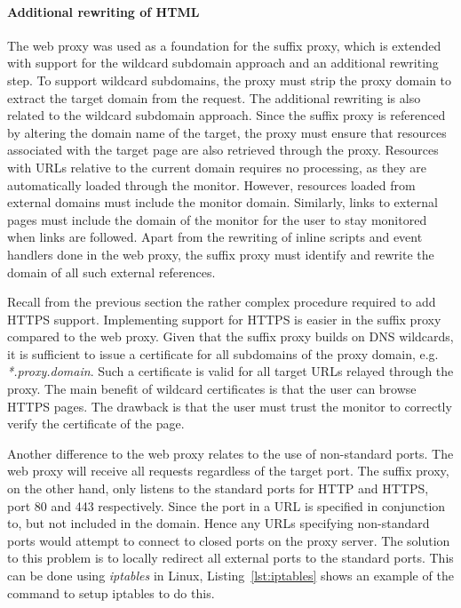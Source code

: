 \documentclass{llncs}
\begin{document}
\paragraph{Additional rewriting of HTML}


The web proxy was used as a foundation for the suffix proxy, which is extended
with support for the wildcard subdomain approach and an additional rewriting step. 
To support wildcard subdomains, the proxy must strip the proxy domain to extract 
the target domain from the request. 
The additional rewriting is also related to the wildcard subdomain approach.
Since the suffix proxy is referenced by altering the domain name of the target, 
the proxy must ensure that resources associated with the target page are also 
retrieved through the proxy. Resources with URLs relative to the current domain 
requires no processing, as they are automatically loaded through the monitor. 
However, resources loaded from external domains must 
include the monitor domain. Similarly, links to external pages must include the domain of the monitor 
for the user to stay %
monitored %
when links are followed.
Apart from the rewriting of inline 
scripts and event handlers done in the web proxy, the suffix proxy must 
identify and rewrite the domain of all such external references. 


Recall from the previous section the rather complex procedure required to add HTTPS support.
Implementing support for HTTPS is easier in the suffix proxy compared to the web proxy. 
Given that the suffix proxy builds on DNS wildcards, it is sufficient to issue a certificate
for all subdomains of the proxy domain, e.g. \emph{*.proxy.domain}. Such a 
certificate is valid for all target URLs relayed through the proxy.
The main benefit of wildcard certificates is that the user can browse HTTPS pages. 
The drawback is that the user must trust the monitor to correctly verify the 
certificate of the page.

Another difference to the web proxy relates to the use of non-standard ports.
The web proxy will receive all requests regardless of the target port. The 
suffix proxy, on the other hand, only listens to the standard ports for HTTP and HTTPS, port 80 and 
443 respectively. Since the port in a URL is specified in conjunction to, but not included in the domain.
Hence any URLs specifying non-standard ports would attempt to connect to closed 
ports on the proxy server. The solution to this problem is to locally redirect 
all external ports to the standard ports. This can be done using \emph{iptables} in Linux, 
Listing~\ref{lst:iptables} shows an example of the command to setup iptables to do this.
\end{document}
